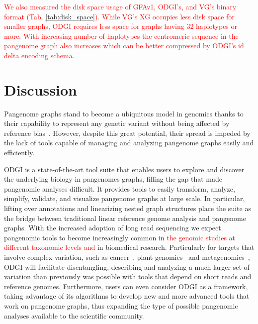 \documentclass{bioinfo}
\newcommand{\REVIEWED}[1]{{\textcolor{Red}{#1}}}
\begin{document}
\REVIEWED{We also measured the disk space usage of GFAv1, ODGI's, and VG's binary format (Tab. \ref{tab:disk_space}). While VG's XG occupies less disk space for smaller graphs, ODGI requires less space for graphs having 32 haplotypes or more. With increasing number of haplotypes the centromeric sequence in the pangenome graph also increases which can be better compressed by ODGI's id delta encoding schema. }





%

%




\section{Discussion}
Pangenome graphs stand to become a ubiquitous model in genomics thanks to their capability to represent any genetic variant without being affected by reference bias~\citep{Eizenga_2020}.
However, despite this great potential, their spread is impeded by the lack of tools capable of managing and analyzing pangenome graphs easily and efficiently.

ODGI is a state-of-the-art tool suite that enables users to explore and discover the underlying biology in pangenomes graphs, filling the gap that made pangenomic analyses difficult.
It provides tools to easily transform, analyze, simplify, validate, and visualize pangenome graphs at large scale.
In particular, lifting over annotations and linearizing nested graph structures place the suite as the bridge between traditional linear reference genome analysis and pangenome graphs.
With the increased adoption of long read sequencing we expect pangenomic tools to become increasingly common in \REVIEWED{the genomic studies at different taxonomic levels and} in biomedical research.
Particularly for targets that involve complex variation, such as cancer\REVIEWED{~\citep{CompPan2016}}, plant genomics\REVIEWED{~\citep{Bayer2020}} and metagenomics\REVIEWED{~\citep{Zhong2021}}, ODGI will facilitate disentangling,
describing and analyzing a much larger set of variation than previously was possible with tools that depend on short reads and reference genomes.
Furthermore, users can even consider ODGI as a framework, taking advantage of its algorithms to develop new and more advanced tools that work on pangenome graphs,
thus expanding the type of possible pangenomic analyses available to the scientific community.
\end{document}
